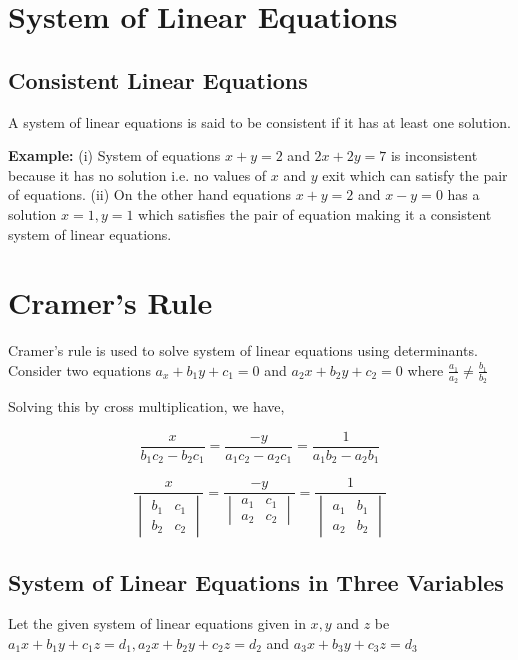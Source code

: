\section{System of Linear Equations}

\subsection{Consistent Linear Equations}
A system of linear equations is said to be consistent if it has at least one
solution.

\textbf{Example:} (i) System of equations $x + y = 2$ and $2x + 2y = 7$ is inconsistent because it has no solution i.e. no values
of $x$ and $y$ exit which can satisfy the pair of equations. (ii) On the other hand equations $x + y = 2$ and $x - y = 0$ has a
solution $x = 1, y = 1$ which satisfies the pair of equation making it a consistent system of linear equations.

\section{Cramer's Rule}
Cramer's rule is used to solve system of linear equations using determinants. Consider two equations $a_x + b_1y + c_1 = 0$ and
$a_2x + b_2y + c_2 = 0$ where $\frac{a_1}{a_2}\neq \frac{b_1}{b_2}$

Solving this by cross multiplication, we have,

$$\frac{x}{b_1c_2 - b_2c_1} = \frac{-y}{a_1c_2 - a_2c_1} = \frac{1}{a_1b_2- a_2b_1}$$

$$\frac{x}{\begin{vmatrix}b_1 & c_1\\b_2 & c_2\end{vmatrix}} = \frac{-y}{\begin{vmatrix}a_1& c_1\\a_2 & c_2\end{vmatrix}} =
\frac{1}{\begin{vmatrix}a_1&b_1\\a_2 & b_2\end{vmatrix}}$$

\subsection{System of Linear Equations in Three Variables}
Let the given system of linear equations given in $x, y$ and $z$ be $a_1x + b_1y + c_1z = d_1, a_2x + b_2y + c_2z = d_2$ and $a_3x
+ b_3y + c_3z = d_3$

